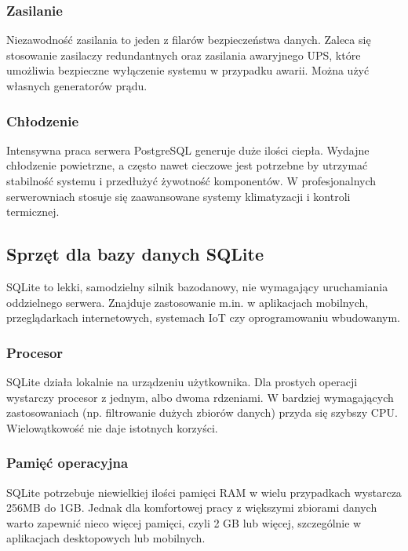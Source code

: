 \documentclass[a4paper,11pt,openany,english]{sphinxmanual}
\begin{document}
\subsubsection{Zasilanie}
\label{\detokenize{rozdzial2/Sprzet-dla-bazy-danych/source/SprzetDlaBazyDanych:zasilanie}}
\sphinxAtStartPar
Niezawodność zasilania to jeden z filarów bezpieczeństwa danych. Zaleca się stosowanie zasilaczy redundantnych oraz zasilania awaryjnego UPS, które umożliwia bezpieczne wyłączenie systemu w przypadku awarii. Można użyć własnych generatorów prądu.


\subsubsection{Chłodzenie}
\label{\detokenize{rozdzial2/Sprzet-dla-bazy-danych/source/SprzetDlaBazyDanych:chlodzenie}}
\sphinxAtStartPar
Intensywna praca serwera PostgreSQL generuje duże ilości ciepła. Wydajne chłodzenie powietrzne, a często nawet cieczowe jest potrzebne by utrzymać stabilność systemu i przedłużyć żywotność komponentów. W profesjonalnych serwerowniach stosuje się zaawansowane systemy klimatyzacji i kontroli termicznej.


\subsection{Sprzęt dla bazy danych SQLite}
\label{\detokenize{rozdzial2/Sprzet-dla-bazy-danych/source/SprzetDlaBazyDanych:sprzet-dla-bazy-danych-sqlite}}
\sphinxAtStartPar
SQLite to lekki, samodzielny silnik bazodanowy, nie wymagający uruchamiania oddzielnego serwera. Znajduje zastosowanie m.in. w aplikacjach mobilnych, przeglądarkach internetowych, systemach IoT czy oprogramowaniu wbudowanym.


\subsubsection{Procesor}
\label{\detokenize{rozdzial2/Sprzet-dla-bazy-danych/source/SprzetDlaBazyDanych:id1}}
\sphinxAtStartPar
SQLite działa lokalnie na urządzeniu użytkownika. Dla prostych operacji wystarczy procesor z jednym, albo dwoma rdzeniami. W bardziej wymagających zastosowaniach (np. filtrowanie dużych zbiorów danych) przyda się szybszy CPU. Wielowątkowość nie daje istotnych korzyści.


\subsubsection{Pamięć operacyjna}
\label{\detokenize{rozdzial2/Sprzet-dla-bazy-danych/source/SprzetDlaBazyDanych:id2}}
\sphinxAtStartPar
SQLite potrzebuje niewielkiej ilości pamięci RAM w wielu przypadkach wystarcza 256MB do 1GB. Jednak dla komfortowej pracy z większymi zbiorami danych warto zapewnić nieco więcej pamięci, czyli 2 GB lub więcej, szczególnie w aplikacjach desktopowych lub mobilnych.
\end{document}
